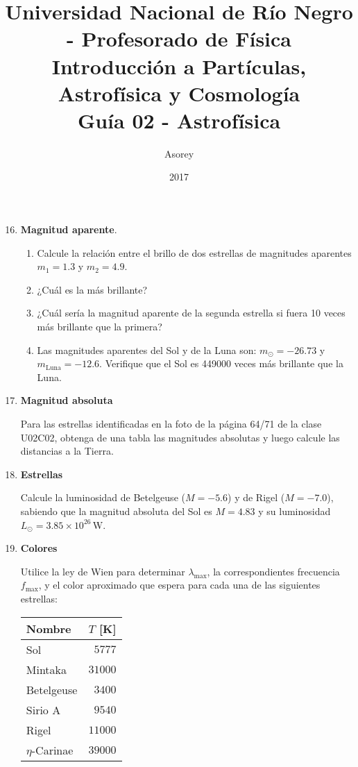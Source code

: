 \documentclass[a4paper,12pt]{article}
\begin{document}
\title{
{\normalsize{Universidad Nacional de Río Negro - Profesorado de Física}}\\
Introducción a Partículas, Astrofísica y Cosmología \\ Guía 02 - Astrofísica\\}
\author{Asorey}
\date{2017}
\maketitle

\begin{enumerate}
\setcounter{enumi}{15}      %
\item{\bf{Magnitud aparente}}.
	
	\begin{enumerate}
		\item Calcule la relación entre el brillo de dos estrellas de
			magnitudes aparentes $m_1=1.3$ y $m_2=4.9$.
		\item ¿Cuál es la más brillante?
		\item ¿Cuál sería la magnitud aparente de la segunda estrella si fuera
			10 veces más brillante que la primera?
		\item Las magnitudes aparentes del Sol y de la Luna son:
			$m_\odot=-26.73$ y $m_{\mathrm{Luna}}=-12.6$. Verifique que el Sol
			es 449000 veces más brillante que la Luna.
	\end{enumerate}

\item{\bf{Magnitud absoluta}}

	Para las estrellas identificadas en la foto de la página 64/71 de la clase
		U02C02, obtenga de una tabla las magnitudes absolutas y luego calcule
		las distancias a la Tierra.  

\item{\bf{Estrellas}}
	
	Calcule la luminosidad de Betelgeuse ($M=-5.6$) y de Rigel ($M=-7.0$),
		sabiendo que la magnitud absoluta del Sol es $M=4.83$ y su luminosidad
		$L_\odot = 3.85\times10^{26}$\,W.

\item{\bf{Colores}}

	Utilice la ley de Wien para determinar $\lambda_{\max}$, la
		correspondientes frecuencia $f_{\max}$, y el color aproximado que
		espera para cada una de las siguientes estrellas:\\
		\begin{tabular}{ l | r }
			Nombre & $T$ [K] \\
			\hline
			Sol & $5777$ \\
			Mintaka & $31000$ \\
			Betelgeuse & $3400$ \\
			Sirio A & $9540$ \\
			Rigel & $11000$ \\
			$\eta$-Carinae & $39000$
		\end{tabular}
	

\end{enumerate}
\end{document}
